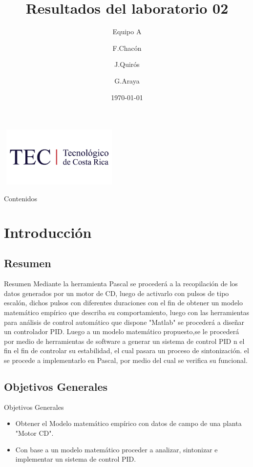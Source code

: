 \documentclass[mathserif,spanish]{beamer}
\title[Resultados del laboratorio XX]{Resultados del laboratorio 02} %
\subtitle{Equipo A} %
\author[F.Chacón \and J.Quirós \and A.Volta]{F.Chacón \and J.Quirós \and G.Araya} %
\institute[Instituto Tecnológico de Costa Rica]{
Instituto Tecnológico de Costa Rica\\
Escuela de Ingeniería Electrónica \\
Identificación y control del péndulo amortiguado a hélice (PAMH)} %
\date{\today}
\begin{document}
    \begin{frame}[plain]
        \begin{center}
            \includegraphics [height=3cm,width=6cm]{TEC}    %
        \end{center}
        \titlepage
    \end{frame}

    \begin{frame}{Contenidos} %
        \tableofcontents 
    \end{frame}


\section{Introducción}          %

\subsection{Resumen}            %
    \begin{frame}{Resumen}
        Mediante la herramienta Pascal se procederá a la recopilación de los datos generados por un motor de CD, luego de activarlo con pulsos de tipo escalón, dichos pulsos con diferentes duraciones con el fin de obtener un modelo matemático empírico que describa su comportamiento, luego con las herramientas para análisis de control automático que dispone "Matlab" se procederá a diseñar un controlador PID. Luego a un modelo matemático propuesto,se le procederá por medio de herramientas de software a generar un sistema de control PID n el fin  el fin de controlar su estabilidad, el cual pasara un proceso de sintonización.  el se procede a implementarlo en Pascal, por medio del cual se verifica su funcional.   \end{frame}

\subsection{Objetivos Generales}
    \begin{frame}{Objetivos Generales}
        \begin{itemize}
            \item Obtener el Modelo matemático empírico con datos de campo de una planta "Motor CD".
            \item Con base a un modelo matemático proceder a analizar, sintonizar e implementar un sistema de control PID.
        \end{itemize}
    \end{frame} %
\end{document}
